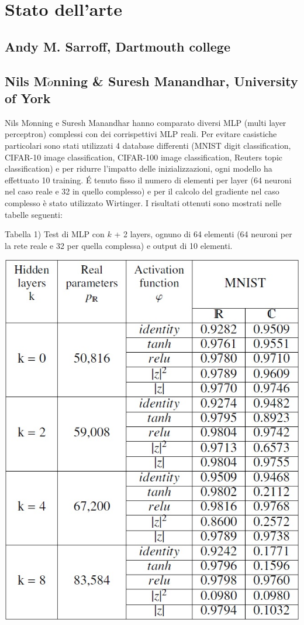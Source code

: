 \documentclass[a4paper,10pt]{article}
\date{22/05/2019}
\begin{document}
 \section{Stato dell'arte}
 \subsection{Andy M. Sarroff, Dartmouth college}
 \subsection{Nils M$\ddot{o}$nning \& Suresh Manandhar, University of York}
 Nils M$\ddot{o}$nning e Suresh Manandhar hanno comparato diversi MLP (multi layer perceptron) complessi con dei corrispettivi MLP reali. Per evitare casistiche particolari sono stati utilizzati 4 database differenti (MNIST digit classification, CIFAR-10 image classification, CIFAR-100 image classification, Reuters topic classification) e per ridurre l'impatto delle inizializzazioni, ogni modello ha effettuato 10 training. \'E tenuto fisso il numero di elementi per layer (64 neuroni nel caso reale e 32 in quello complesso) e per il calcolo del gradiente nel caso complesso è stato utilizzato Wirtinger. I risultati ottenuti sono mostrati nelle tabelle seguenti:
 
 
 Tabella 1) Test di MLP con $k$ + 2 layers, ognuno di 64 elementi (64 neuroni per la rete reale e 32 per quella complessa) e output di 10 elementi.
 
\includegraphics[width=%
\textwidth]{tabella1}
\end{document}
